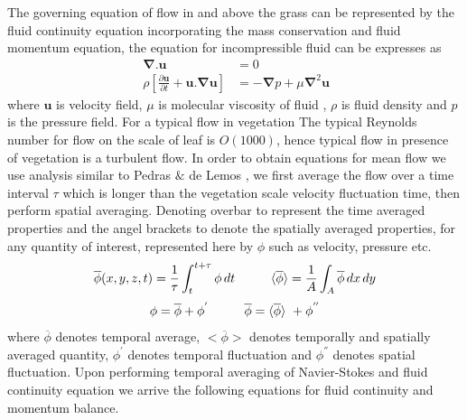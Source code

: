 \documentclass[12pt]{report}   %
\newcommand{\bu}{\mathbf{u}}
\newcommand{\grad}{\mathbf{\nabla}}
\renewcommand{\bar}{\overline}
\begin{document}
The governing equation of flow in and above the grass can be represented by the fluid continuity equation incorporating the mass conservation and fluid momentum equation, the equation for incompressible fluid can be expresses as
\begin{equation}\
\begin{split}
  \grad .{\bu}&=0 \\
 \rho \left[ \frac{\partial {\bu}  }{\partial t}+  {\bu} . \grad \bu  \right ] &= - \grad{p} +\mu \grad^2\bu
\end{split}
\label{NavierStokes}
\end{equation}
where $\bu$ is velocity field, $\mu$ is molecular viscosity of fluid , $\rho$ is fluid density and $p$ is the pressure field.
For a typical flow in vegetation The typical Reynolds number for flow on the scale of leaf is $O(1000)$, hence typical flow in presence of vegetation is a turbulent flow. In order to obtain equations for mean flow we use analysis similar to Pedras $\&$ de Lemos \cite{Pedras00}, we first average the flow over a time interval $\tau$ which is longer than the vegetation scale velocity fluctuation time, then perform spatial averaging. Denoting 
overbar to represent the time averaged properties and the angel brackets to denote the spatially averaged properties, for any quantity of interest, represented here by $\phi$ such as velocity, pressure etc.
  \[ \bar{\phi}(x,y,z,t) = \frac{1}{\tau} \int_{t}^{t+\tau} \phi  \, dt \hspace{1.cm}  \langle \bar{\phi}\rangle = \frac{1}{A} \int_{A} \bar{\phi}  \,dx \,dy \]
  \[\phi = \bar{\phi}+\phi^{'} \hspace{1.cm}  \bar{\phi} = \langle \bar{\phi} \rangle \ +\phi^{''} \]
 where $\bar{\phi}$ denotes temporal average, $<\bar{\phi}>$ denotes temporally and spatially averaged quantity, $\phi^{'}$ denotes temporal fluctuation and $\phi^{''}$ denotes spatial fluctuation. Upon performing temporal averaging of Navier-Stokes and fluid continuity equation we arrive the following equations for fluid continuity and momentum balance.
\end{document}

